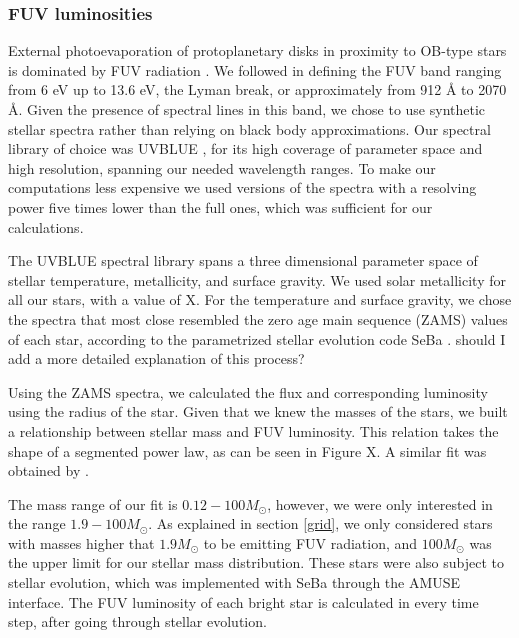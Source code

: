 \documentclass[fleqn,usenatbib]{mnras}
\newcommand\note[1]{{\colorbox{yellow!60}{\color{magenta}#1}}}
\begin{document}
\subsubsection{FUV luminosities}\label{FUVluminosities}
External photoevaporation of protoplanetary disks in proximity to OB-type stars is dominated by FUV radiation \citep{guarcello2016,storzer1999,gorti2016a}. We followed \citet{adams2004} in defining the FUV band ranging from 6 eV up to 13.6 eV, the Lyman break, or approximately from 912 Å to 2070 Å. Given the presence of spectral lines in this band, we chose to use synthetic stellar spectra rather than relying on black body approximations. Our spectral library of choice was UVBLUE \citep{rodriguez-merino2005}, for its high coverage of parameter space and high resolution, spanning our needed wavelength ranges. To make our computations less expensive we used versions of the spectra with a resolving power five times lower than the full ones, which was sufficient for our calculations. 

The UVBLUE spectral library spans a three dimensional parameter space of stellar temperature, metallicity, and surface gravity. We used solar metallicity for all our stars, with a value of \note{X}. For the temperature and surface gravity, we chose the spectra that most close resembled the zero age main sequence (ZAMS) values of each star, according to the parametrized stellar evolution code SeBa \citep{portegieszwart1996, toonen2012}. \note{should I add a more detailed explanation of this process?}

Using the ZAMS spectra, we calculated the flux and corresponding luminosity using the radius of the star. Given that we knew the masses of the stars, we built a relationship between stellar mass and FUV luminosity. This relation takes the shape of a segmented power law, as can be seen in Figure X. A similar fit was obtained by \citet{parravano2003}.



The mass range of our fit is $0.12 - 100 M_{\odot}$, however, we were only interested in the range $1.9 - 100 M_{\odot}$. As explained in section \ref{grid}, we only considered stars with masses higher that $1.9 M_{\odot}$ to be emitting FUV radiation, and $100 M_{\odot}$ was the upper limit for our stellar mass distribution. These stars were also subject to stellar evolution, which was implemented with SeBa through the AMUSE interface. The FUV luminosity of each bright star is calculated in every time step, after going through stellar evolution.
\end{document}
